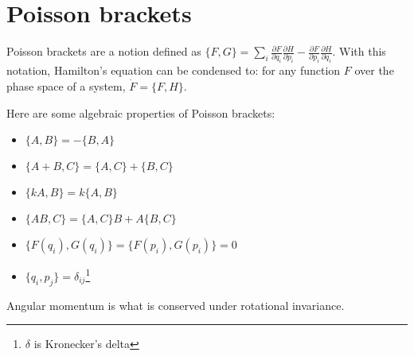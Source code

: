 \documentclass[12pt]{article}
\begin{document}
\section{Poisson brackets}

Poisson brackets are a notion defined as $\{F,G\} = \sum_i \frac{\partial
  F}{\partial q_i} \frac{\partial H}{\partial p_i} - \frac{\partial F}{\partial
  p_i} \frac{\partial H}{\partial q_i}$.  With this notation, Hamilton's
equation can be condensed to: for any function $F$ over the phase space of a
system, $\dot F = \{F,H\}$.

Here are some algebraic properties of Poisson brackets:

\begin{itemize}
\item $\{A,B\} = -\{B,A\}$
\item $\{A+B,C\} = \{A,C\} + \{B,C\}$
\item $\{kA,B\} = k\{A,B\}$
\item $\{AB,C\} = \{A,C\}B + A\{B,C\}$
\item $\{F(q_i),G(q_i)\} = \{F(p_i),G(p_i)\} = 0$
\item $\{q_i, p_j\} = \delta_{i j}$\footnote{$\delta$ is Kronecker's delta}
\end{itemize}

Angular momentum is what is conserved under rotational invariance.
\end{document}
